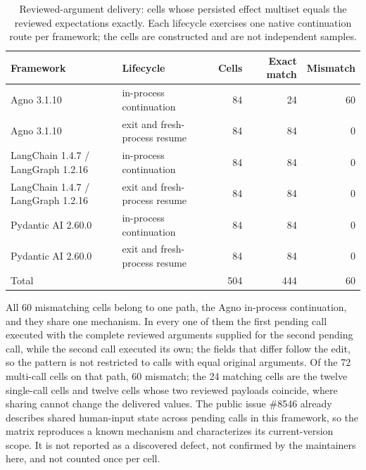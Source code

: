 \begin{table}[htbp]
\centering\small
\caption{Reviewed-argument delivery: cells whose persisted effect multiset equals the
reviewed expectations exactly. Each lifecycle exercises one native continuation route
per framework; the cells are constructed and are not independent samples.}
\label{tab:a17-correction-consumption}
\begin{tabular}{llrrr}
\toprule
Framework & Lifecycle & Cells & Exact match & Mismatch\\
\midrule
Agno 3.1.10 & in-process continuation & 84 & 24 & 60\\
Agno 3.1.10 & exit and fresh-process resume & 84 & 84 & 0\\
LangChain 1.4.7 / LangGraph 1.2.16 & in-process continuation & 84 & 84 & 0\\
LangChain 1.4.7 / LangGraph 1.2.16 & exit and fresh-process resume & 84 & 84 & 0\\
Pydantic AI 2.60.0 & in-process continuation & 84 & 84 & 0\\
Pydantic AI 2.60.0 & exit and fresh-process resume & 84 & 84 & 0\\
\midrule
Total & & 504 & 444 & 60\\
\bottomrule
\end{tabular}
\end{table}

All 60 mismatching cells belong to one path, the Agno in-process continuation, and
they share one mechanism. In every one of them the first pending call executed with
the complete reviewed arguments supplied for the second pending call, while the second
call executed its own; the fields that differ follow the edit, so the pattern is not
restricted to calls with equal original arguments. Of the 72 multi-call cells on that
path, 60 mismatch; the 24 matching cells are the twelve single-call cells and twelve
cells whose two reviewed payloads coincide, where sharing cannot change the delivered
values. The public issue \#8546 already describes shared human-input state across
pending calls in this framework, so the matrix reproduces a known mechanism and
characterizes its current-version scope. It is not reported as a discovered defect,
not confirmed by the maintainers here, and not counted once per cell.


